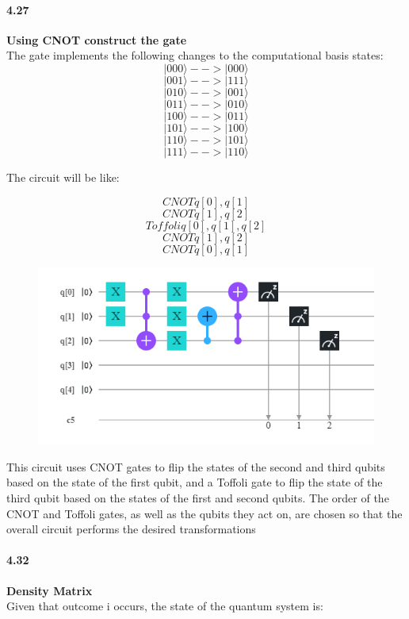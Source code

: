 \paragraph{4.27} \textbf{Using CNOT construct the gate}
\\

The gate implements the following changes to the computational basis states:
$$|000\rangle --> |000\rangle$$
$$|001\rangle --> |111\rangle$$
$$|010\rangle --> |001\rangle$$
$$|011\rangle --> |010\rangle$$
$$|100\rangle --> |011\rangle$$
$$|101\rangle --> |100\rangle$$
$$|110\rangle --> |101\rangle$$
$$|111\rangle --> |110\rangle$$


The circuit will be like:

  $$CNOT q[0], q[1]$$
  $$CNOT q[1], q[2]$$
  $$Toffoli q[0], q[1], q[2]$$
  $$CNOT q[1], q[2]$$
  $$CNOT q[0], q[1]$$

  \begin{figure}
      \centering
      \includegraphics{Chapter 4/4.27.png}
      \caption{}
      \label{fig:my_label}
  \end{figure}

This circuit uses CNOT gates to flip the states of the second and third qubits based on the state of the first qubit, and a Toffoli gate to flip the state of the third qubit based on the states of the first and second qubits. The order of the CNOT and Toffoli gates, as well as the qubits they act on, are chosen so that the overall circuit performs the desired transformations

\paragraph{4.32} \textbf{Density Matrix}
\\

Given that outcome i occurs, the state of the quantum system is: 


